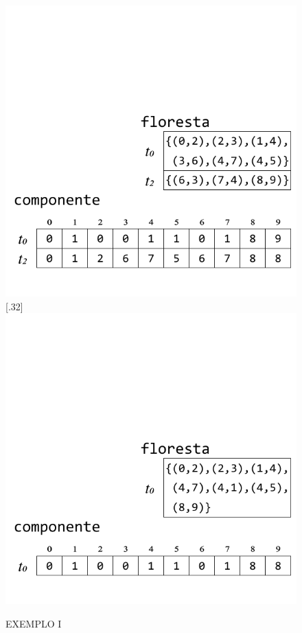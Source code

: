\documentclass[12pt]{article}
\begin{document}
\begin{figure}[h]
{		\includegraphics[width=\linewidth]{E.pdf}
	}
	\subcaptionbox{}[.32\textwidth]
	{
		\includegraphics[width=\linewidth]{F.pdf}
	}
	\caption{EXEMPLO I}
\end{figure}
\end{document}
